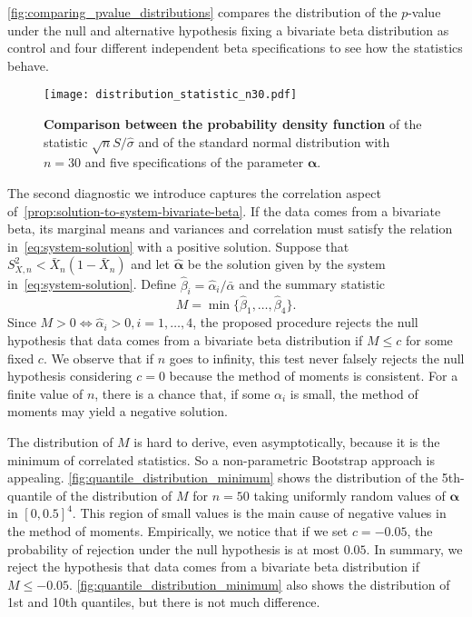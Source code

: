 \documentclass[a4paper, notitlepage, 10pt]{article}
\newcommand{\parameter}{\boldsymbol{\alpha}}
\theoremstyle{definition}
\begin{document}
\autoref{fig:comparing_pvalue_distributions} compares the distribution of the $p$-value under the null and alternative hypothesis fixing a bivariate beta distribution as control and four different independent beta specifications to see how the statistics behave.

\begin{figure}[!ht]
    \centering 
\texttt{[image: distribution\_statistic\_n30.pdf]}
    \caption{{\bf Comparison between the probability density function} of the statistic $\sqrt{n} S/\hat\sigma$ and of the standard normal distribution with $n=30$ and five specifications of the parameter $\parameter$.}\label{fig:distribution_statistic_n30}
\end{figure}

The second diagnostic we introduce captures the correlation aspect of~\autoref{prop:solution-to-system-bivariate-beta}.
If the data comes from a bivariate beta, its marginal means and variances and correlation must satisfy the relation in~\eqref{eq:system-solution} with a positive solution.
Suppose that $S_{X,n}^2 < \bar{X}_n(1-\bar{X}_n)$ and let $\hat{\parameter}$ be the solution given by the system in~\eqref{eq:system-solution}. 
Define $\hat{\beta}_i = \hat{\alpha}_i/\bar{\alpha}$ and the summary statistic 
\[
M = \min\{\hat{\beta}_1, \dots, \hat{\beta}_4\}.
\]
Since $M > 0 \iff \hat{\alpha}_i > 0, i=1,\dots,4$, the proposed procedure rejects the null hypothesis that data comes from a bivariate beta distribution if $M \le c$ for some fixed $c$.
We observe that if $n$ goes to infinity, this test never falsely rejects the null hypothesis considering $c=0$ because the method of moments is consistent.
For a finite value of $n$, there is a chance that, if some $\alpha_i$ is small, the method of moments may yield a negative solution.

The distribution of $M$ is hard to derive, even asymptotically, because it is the minimum of correlated statistics.
So a non-parametric Bootstrap approach is appealing.
\autoref{fig:quantile_distribution_minimum} shows the distribution of the 5th-quantile of the distribution of $M$ for $n=50$ taking uniformly random values of $\parameter$ in ${[0,0.5]}^4$.
This region of small values is the main cause of negative values in the method of moments. 
Empirically, we notice that if we set $c=-0.05$, the probability of rejection under the null hypothesis is at most $0.05$. 
In summary, we reject the hypothesis that data comes from a bivariate beta distribution if $M \le -0.05$.
\autoref{fig:quantile_distribution_minimum} also shows the distribution of 1st and 10th quantiles, but there is not much difference. 
\end{document}
